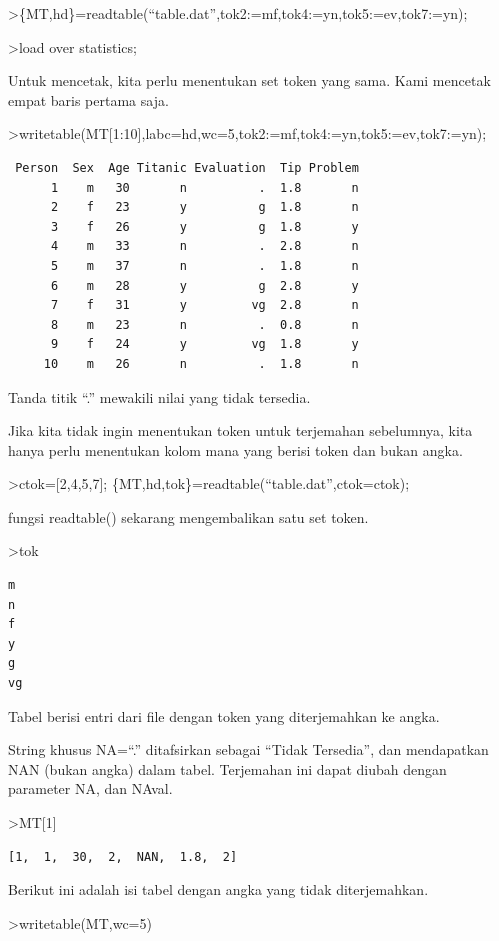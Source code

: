 \documentclass[
]{book}
\begin{document}
\textgreater\{MT,hd\}=readtable(``table.dat'',tok2:=mf,tok4:=yn,tok5:=ev,tok7:=yn);

\textgreater load over statistics;

Untuk mencetak, kita perlu menentukan set token yang sama. Kami mencetak empat baris pertama saja.

\textgreater writetable(MT{[}1:10{]},labc=hd,wc=5,tok2:=mf,tok4:=yn,tok5:=ev,tok7:=yn);

\begin{verbatim}
 Person  Sex  Age Titanic Evaluation  Tip Problem
      1    m   30       n          .  1.8       n
      2    f   23       y          g  1.8       n
      3    f   26       y          g  1.8       y
      4    m   33       n          .  2.8       n
      5    m   37       n          .  1.8       n
      6    m   28       y          g  2.8       y
      7    f   31       y         vg  2.8       n
      8    m   23       n          .  0.8       n
      9    f   24       y         vg  1.8       y
     10    m   26       n          .  1.8       n
\end{verbatim}

Tanda titik ``.'' mewakili nilai yang tidak tersedia.

Jika kita tidak ingin menentukan token untuk terjemahan sebelumnya, kita hanya perlu menentukan kolom mana yang berisi token dan bukan angka.

\textgreater ctok={[}2,4,5,7{]}; \{MT,hd,tok\}=readtable(``table.dat'',ctok=ctok);

fungsi readtable() sekarang mengembalikan satu set token.

\textgreater tok

\begin{verbatim}
m
n
f
y
g
vg
\end{verbatim}

Tabel berisi entri dari file dengan token yang diterjemahkan ke angka.

String khusus NA=``.'' ditafsirkan sebagai ``Tidak Tersedia'', dan mendapatkan NAN (bukan angka) dalam tabel. Terjemahan ini dapat diubah dengan parameter NA, dan NAval.

\textgreater MT{[}1{]}

\begin{verbatim}
[1,  1,  30,  2,  NAN,  1.8,  2]
\end{verbatim}

Berikut ini adalah isi tabel dengan angka yang tidak diterjemahkan.

\textgreater writetable(MT,wc=5)
\end{document}
